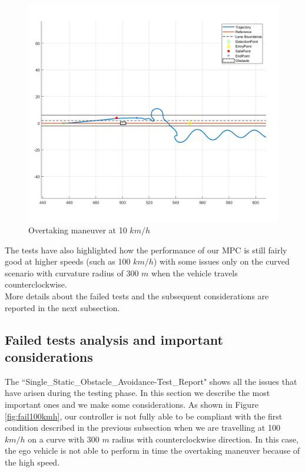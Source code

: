 \begin{figure}[H]
    \centering
    \includegraphics[width=1\textwidth,keepaspectratio]{Figures/Failed10kmh.png}
    \caption{Overtaking maneuver at 10 $km/h$}
    \label{fig:overtaking_10}
\end{figure}




The tests have also highlighted how the performance of our MPC is still fairly good at higher speeds (such as 100 $km/h$) with some issues only on the curved scenario with curvature radius of 300 $m$ when the vehicle travels counterclockwise. \\ 
More details about the failed tests and the subsequent considerations are reported in the next subsection.

\subsection{Failed tests analysis and important considerations} \label{subsection:failed_tests}
The ``Single\_Static\_Obstacle\_Avoidance-Test\_Report" shows all the issues that have arisen during the testing phase. In this section we describe the most important ones and we make some considerations.
As shown in Figure \ref{fig:fail100kmh}, our controller is not fully able to be compliant with the first condition described in the previous subsection when we are travelling at 100 $km/h$ on a curve with 300 $m$ radius with counterclockwise direction. In this case, the ego vehicle is not able to perform in time the overtaking maneuver because of the high speed. 

